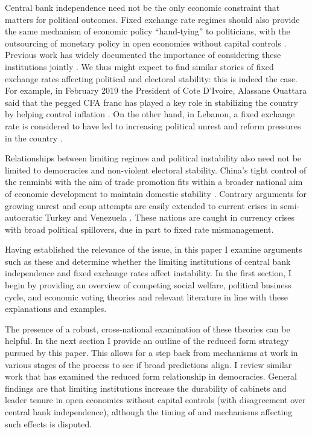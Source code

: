 \documentclass{article}
\begin{document}
    Central bank independence need not be the only economic constraint that matters for political outcomes. Fixed exchange rate regimes should also provide the same mechanism of economic policy “hand-tying” to politicians, with the outsourcing of monetary policy in open economies without capital controls 
    \citep{fleming_domestic_1962, mundell_capital_1963}. Previous work has widely documented the importance of considering these institutions jointly \citep{bernhard_political_2002}. We thus might expect to find similar stories of fixed exchange rates affecting political and electoral stability: this is indeed the case. For example, in February 2019 the President of Cote D’Ivoire, Alassane Ouattara said that the pegged CFA franc has played a key role in stabilizing the country by helping control inflation \citep{bassompierre_ivorian_2019}. On the other hand, in Lebanon, a fixed exchange rate is considered to have led to increasing political unrest and reform pressures in the country \citep{diwan_lebanons_2020}.

    Relationships between limiting regimes and political instability also need not be limited to democracies and non-violent electoral stability. China’s tight control of the renminbi with the aim of trade promotion fits within a broader national aim of economic development to maintain domestic stability \citep{kroeber_renminbi_2011}. Contrary arguments for growing unrest and coup attempts are easily extended to current crises in semi-autocratic Turkey \citep{taner_turkish_2019} and Venezuela \citep{armas_venezuela_2019}. These nations are caught in currency crises with broad political spillovers, due in part to fixed rate mismanagement.

    Having established the relevance of the issue, in this paper I examine arguments such as these and determine whether the limiting institutions of central bank independence and fixed exchange rates affect instability. In the first section, I begin by providing an overview of competing social welfare, political business cycle, and economic voting theories and relevant literature in line with these explanations and examples.

    The presence of a robust, cross-national examination of these theories can be helpful. In the next section I provide an outline of the reduced form strategy pursued by this paper. This allows for a step back from mechanisms at work in various stages of the process to see if broad predictions align. I review similar work that has examined the reduced form relationship in democracies. General findings are that limiting institutions increase the durability of cabinets and leader tenure in open economies without capital controls (with disagreement over central bank independence), although the timing of and mechanisms affecting such effects is disputed.
\end{document}
